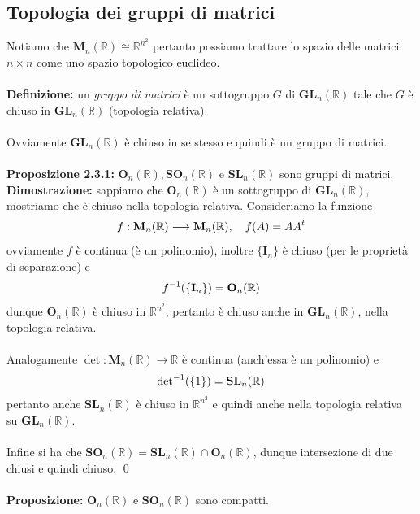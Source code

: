 \documentclass{article}
\begin{document}
\newpage
\subsection{Topologia dei gruppi di matrici}
Notiamo che $\mathbf{M}_n(\mathbb{R}) \cong \mathbb{R}^{n^2}$ pertanto possiamo trattare lo spazio delle matrici $n \times n$ come uno spazio topologico euclideo. \\ \\
\textbf{Definizione:} un \textit{gruppo di matrici} è un sottogruppo $G$ di $\mathbf{GL}_n(\mathbb{R})$ tale che $G$ è chiuso in $\mathbf{GL}_n(\mathbb{R})$ (topologia relativa). \\ \\
Ovviamente $\mathbf{GL}_n(\mathbb{R})$ è chiuso in se stesso e quindi è un gruppo di matrici. \\ \\
\textbf{Proposizione 2.3.1:} $\mathbf{O}_n(\mathbb{R}), \mathbf{SO}_n(\mathbb{R})$ e $\mathbf{SL}_n(\mathbb{R})$ sono gruppi di matrici. \\

\textbf{Dimostrazione:} sappiamo che $\mathbf{O}_n(\mathbb{R})$ è un sottogruppo di $\mathbf{GL}_n(\mathbb{R})$, mostriamo che è chiuso nella topologia relativa. Consideriamo la funzione
\begin{gather}
    f : \mathbf{M}_n(\mathbb{R}) \longrightarrow \mathbf{M}_n(\mathbb{R}), \quad f(A) = AA^t \notag
\end{gather}
ovviamente $f$ è continua (è un polinomio), inoltre $\{ \mathbf{I}_n \}$ è chiuso (per le proprietà di separazione) e
\begin{gather}
    f^{-1}(\{ \mathbf{I}_n \}) = \mathbf{O}_n(\mathbb{R}) \notag
\end{gather}
dunque $\mathbf{O}_n(\mathbb{R})$ è chiuso in $\mathbb{R}^{n^2}$, pertanto è chiuso anche in $\mathbf{GL}_n(\mathbb{R})$, nella topologia relativa. \\ \\
Analogamente $\det : \mathbf{M}_n(\mathbb{R}) \longrightarrow \mathbb{R}$ è continua (anch'essa è un polinomio) e
\begin{gather}
    \mathrm{det}^{-1}(\{ 1 \}) = \mathbf{SL}_n(\mathbb{R}) \notag
\end{gather}
pertanto anche $\mathbf{SL}_n(\mathbb{R})$ è chiuso in $\mathbb{R}^{n^2}$ e quindi anche nella topologia relativa su $\mathbf{GL}_n(\mathbb{R})$. \\ \\
Infine si ha che $\mathbf{SO}_n(\mathbb{R}) = \mathbf{SL}_n(\mathbb{R}) \cap \mathbf{O}_n(\mathbb{R})$, dunque intersezione di due chiusi e quindi chiuso. \qed \\ \\
\textbf{Proposizione:} $\mathbf{O}_n(\mathbb{R})$ e $\mathbf{SO}_n(\mathbb{R})$ sono compatti. \\
\end{document}
